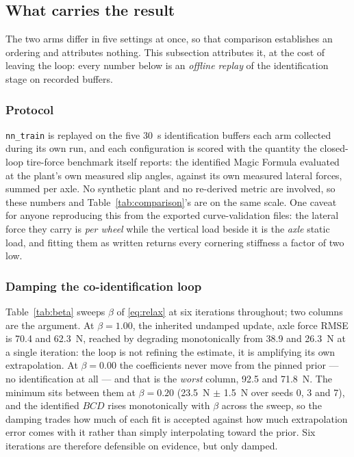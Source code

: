 \subsection{What carries the result}
\label{subsec:ablations}

The two arms differ in five settings at once, so that comparison establishes an
ordering and attributes nothing. This subsection attributes it, at the cost of
leaving the loop: every number below is an \emph{offline replay} of the
identification stage on recorded buffers.

\subsubsection{Protocol}
\texttt{nn\_train} is replayed on the five \SI{30}{\second} identification
buffers each arm collected during its own run, and each configuration is scored
with the quantity the closed-loop tire-force benchmark itself reports: the
identified Magic Formula evaluated at the plant's own measured slip angles,
against its own measured lateral forces, summed per axle. No synthetic plant
and no re-derived metric are involved, so these numbers and
Table~\ref{tab:comparison}'s are on the same scale. One caveat for anyone
reproducing this from the exported curve-validation files: the lateral force
they carry is \emph{per wheel} while the vertical load beside it is the
\emph{axle} static load, and fitting them as written returns every cornering
stiffness a factor of two low.

\subsubsection{Damping the co-identification loop}
Table~\ref{tab:beta} sweeps $\beta$ of \eqref{eq:relax} at six iterations
throughout; two columns are the argument. At $\beta=\num{1.00}$, the inherited
undamped update, axle force RMSE is \num{70.4} and \SI{62.3}{\newton}, reached
by degrading monotonically from \num{38.9} and \SI{26.3}{\newton} at a single
iteration: the loop is not refining the estimate, it is amplifying its own
extrapolation. At $\beta=\num{0.00}$ the coefficients never move from the
pinned prior --- no identification at all --- and that is the \emph{worst}
column, \num{92.5} and \SI{71.8}{\newton}. The minimum sits between them at
$\beta=\num{0.20}$ (\SI{23.5}{\newton} $\pm$ \SI{1.5}{\newton} over seeds
\num{0}, \num{3} and \num{7}), and the identified $BCD$ rises monotonically
with $\beta$ across the sweep, so the damping trades how much of each fit is
accepted against how much extrapolation error comes with it rather than simply
interpolating toward the prior. Six iterations are therefore defensible on
evidence, but only damped.

